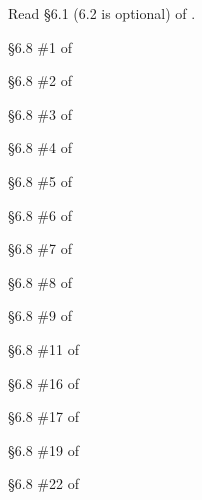 Read \S 6.1 (6.2 is optional) of \cite {tw}.

\begin{problem}[10 points]
	\S 6.8 \#1 of \cite {tw}
\end{problem}

\begin{problem}[10 points]
	\S 6.8 \#2 of \cite {tw}
\end{problem}

\begin{problem}[10 points]
	\S 6.8 \#3 of \cite {tw}
\end{problem}

\begin{problem}[10 points]
	\S 6.8 \#4 of \cite {tw}
\end{problem}

\begin{problem}[10 points]
	\S 6.8 \#5 of \cite {tw}
\end{problem}

\begin{problem}[10 points]
	\S 6.8 \#6 of \cite {tw}
\end{problem}

\begin{problem}[15 points]
	\S 6.8 \#7 of \cite {tw}
\end{problem}

\begin{problem}[10 points]
	\S 6.8 \#8 of \cite {tw}
\end{problem}

\begin{problem}[20 points]
	\S 6.8 \#9 of \cite {tw}
\end{problem}

\begin{problem}[15 points]
	\S 6.8 \#11 of \cite {tw}
\end{problem}

\begin{problem}[15 points]
	\S 6.8 \#16 of \cite {tw}
\end{problem}

\begin{problem}[10 points]
	\S 6.8 \#17 of \cite {tw}
\end{problem}

\begin{problem}[15 points]
	\S 6.8 \#19 of \cite {tw}
\end{problem}

\begin{problem}[10 points]
	\S 6.8 \#22 of \cite {tw}
\end{problem}

